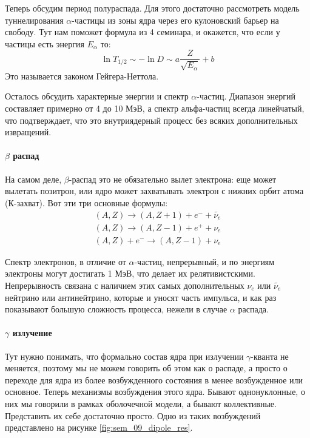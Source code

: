 \documentclass[12pt]{article}
\begin{document}
Теперь обсудим период полураспада. Для этого достаточно рассмотреть модель туннелирования $\alpha$-частицы из зоны ядра через его кулоновский барьер на свободу. Тут нам поможет формула из 4 семинара, и окажется, что если у частицы есть энергия $E_{\alpha}$ то:
\begin{equation}
    \ln{T_{1/2}} \sim -\ln{D} \sim a \dfrac{Z}{\sqrt{E_{\alpha}}} + b
\end{equation}
Это называется законом Гейгера-Неттола. 

Осталось обсудить характерные энергии и спектр $\alpha$-частиц. Диапазон энергий составляет примерно от 4 до 10 МэВ, а спектр альфа-частиц всегда линейчатый, что подтверждает, что это внутриядерный процесс без всяких дополнительных извращений.

\paragraph{$\beta$ распад}
На самом деле, $\beta$-распад это не обязательно вылет электрона: еще может вылетать позитрон, или ядро может захватывать электрон с нижних орбит атома (К-захват). Вот эти три основные формулы:
\begin{gather*}
    (A,Z) \rightarrow (A, Z+1) + e^- + \widetilde{\nu_e}\\
    (A,Z) \rightarrow (A, Z-1) + e^+ + \nu_e\\
    (A,Z) +e^- \rightarrow (A, Z-1) + \nu_e
\end{gather*}

Спектр электронов, в отличие от $\alpha$-частиц, непрерывный, и по энергиям электроны могут достигать 1 МэВ, что делает их релятивистскими. Непрерывность связана с наличием этих самых дополнительных $\nu_e$ или $\widetilde{\nu_e}$ нейтрино или антинейтрино, которые и уносят часть импульса, и как раз показывают большую сложность процесса, нежели в случае $\alpha$ распада.

\paragraph{$\gamma$ излучение}
Тут нужно понимать, что формально состав ядра при излучении $\gamma$-кванта не меняется, поэтому мы не можем говорить об этом как о распаде, а просто о переходе для ядра из более возбужденного состояния в менее возбужденное или основное. Теперь механизмы возбуждения этого ядра. Бывают однонуклонные, о них мы говорили в рамках оболочечной модели, а бывают коллективные. Представить их себе достаточно просто. Одно из таких возбуждений представлено на рисунке \ref{fig:sem_09_dipole_res}.
\end{document}
